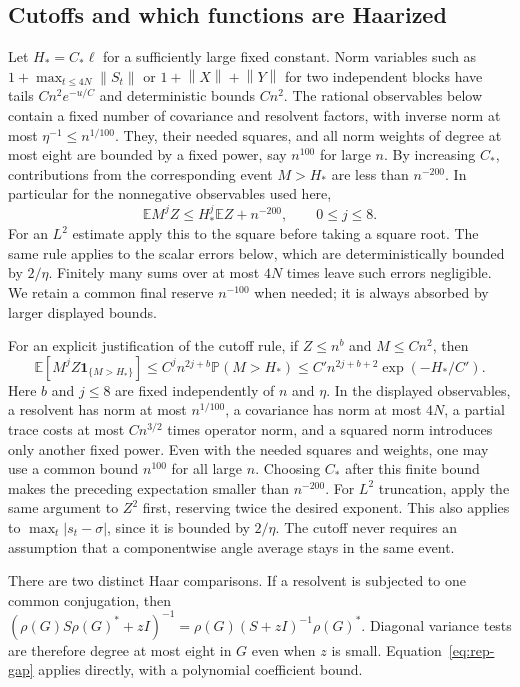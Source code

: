 \documentclass[11pt]{article}
\theoremstyle{definition}\newtheorem{definition}[theorem]{Definition}
\theoremstyle{remark}\newtheorem{remark}[theorem]{Remark}
\newcommand{\E}{\mathbb E}
\newcommand{\PP}{\mathbb P}
\newcommand{\norm}[1]{\left\lVert#1\right\rVert}
\newcommand{\one}{\mathbf1}
\begin{document}
\subsection{Cutoffs and which functions are Haarized}
Let $H_*=C_*\ell$ for a sufficiently large fixed constant. Norm variables such as
$1+\max_{t\le4N}\norm{S_t}$ or $1+\norm X+\norm Y$ for two independent blocks have tails $Cn^2e^{-u/C}$ and deterministic bounds $Cn^2$. The rational observables below contain a fixed number of covariance and resolvent factors, with inverse norm at most $\eta^{-1}\le n^{1/100}$. They, their needed squares, and all norm weights of degree at most eight are bounded by a fixed power, say $n^{100}$ for large $n$. By increasing $C_*$, contributions from the corresponding event $M>H_*$ are less than $n^{-200}$. In particular for the nonnegative observables used here,
\begin{equation}\label{eq:weight}
 \E M^j Z\le H_*^j\E Z+n^{-200},\qquad 0\le j\le8.
\end{equation}
For an $L^2$ estimate apply this to the square before taking a square root. The same rule applies to the scalar errors below, which are deterministically bounded by $2/\eta$. Finitely many sums over at most $4N$ times leave such errors negligible. We retain a common final reserve $n^{-100}$ when needed; it is always absorbed by larger displayed bounds.

For an explicit justification of the cutoff rule, if $Z\le n^b$ and $M\le Cn^2$, then
\[
 \E[M^jZ\one_{\{M>H_*\}}]
 \le C^j n^{2j+b}\PP(M>H_*)
 \le C'n^{2j+b+2}\exp(-H_*/C').
\]
Here $b$ and $j\le8$ are fixed independently of $n$ and $\eta$. In the displayed observables, a resolvent has norm at most $n^{1/100}$, a covariance has norm at most $4N$, a partial trace costs at most $Cn^{3/2}$ times operator norm, and a squared norm introduces only another fixed power. Even with the needed squares and weights, one may use a common bound $n^{100}$ for all large $n$. Choosing $C_*$ after this finite bound makes the preceding expectation smaller than $n^{-200}$. For $L^2$ truncation, apply the same argument to $Z^2$ first, reserving twice the desired exponent. This also applies to $\max_t|s_t-\sigma|$, since it is bounded by $2/\eta$. The cutoff never requires an assumption that a componentwise angle average stays in the same event.


There are two distinct Haar comparisons. If a resolvent is subjected to one common conjugation, then
$(\rho(G)S\rho(G)^*+zI)^{-1}=\rho(G)(S+zI)^{-1}\rho(G)^*$.
Diagonal variance tests are therefore degree at most eight in $G$ even when $z$ is small. Equation~\eqref{eq:rep-gap} applies directly, with a polynomial coefficient bound.
\end{document}
